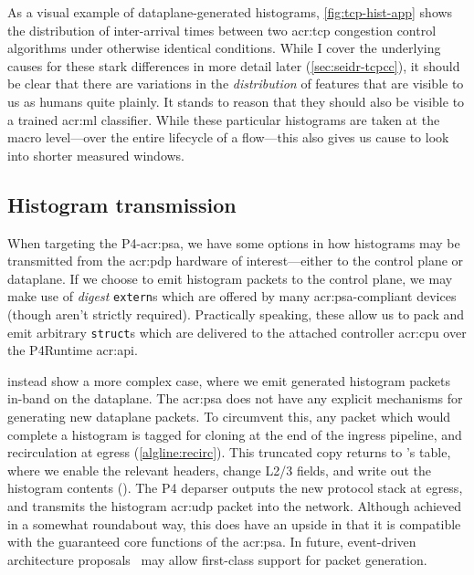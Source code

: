 As a visual example of dataplane-generated histograms, \cref{fig:tcp-hist-app} shows the distribution of inter-arrival times between two \gls{acr:tcp} congestion control algorithms under otherwise identical conditions.
While I cover the underlying causes for these stark differences in more detail later (\cref{sec:seidr-tcpcc}), it should be clear that there are variations in the \emph{distribution} of features that are visible to us as humans quite plainly.
It stands to reason that they should also be visible to a trained \gls{acr:ml} classifier.
While these particular histograms are taken at the macro level---over the entire lifecycle of a flow---this also gives us cause to look into shorter measured windows.

\subsection{Histogram transmission}\label{sec:seidr-histo-tx}
When targeting the P4-\gls{acr:psa}, we have some options in how histograms may be transmitted from the \gls{acr:pdp} hardware of interest---either to the control plane or dataplane.
If we choose to emit histogram packets to the control plane, we may make use of \emph{digest} \texttt{extern}s which are offered by many \gls{acr:psa}-compliant devices (though aren't strictly required).
Practically speaking, these allow us to pack and emit arbitrary \texttt{struct}s which are delivered to the attached controller \gls{acr:cpu} over the P4Runtime \gls{acr:api}.

 instead show a more complex case, where we emit generated histogram packets in-band on the dataplane.
The \gls{acr:psa} does not have any explicit mechanisms for generating new dataplane packets.
To circumvent this, any packet which would complete a histogram is tagged for cloning at the end of the ingress pipeline, and recirculation at egress (\cref{algline:recirc}).
This truncated copy returns to \seidr{}'s table, where we enable the relevant headers, change L2/3 fields, and write out the histogram contents ().
The P4 deparser outputs the new protocol stack at egress, and transmits the histogram \gls{acr:udp} packet into the network.
Although achieved in a somewhat roundabout way, this does have an upside in that it is compatible with the guaranteed core functions of the \gls{acr:psa}.
In future, event-driven architecture proposals~\parencite{DBLP:conf/hotnets/IbanezABM19} may allow first-class support for packet generation.


